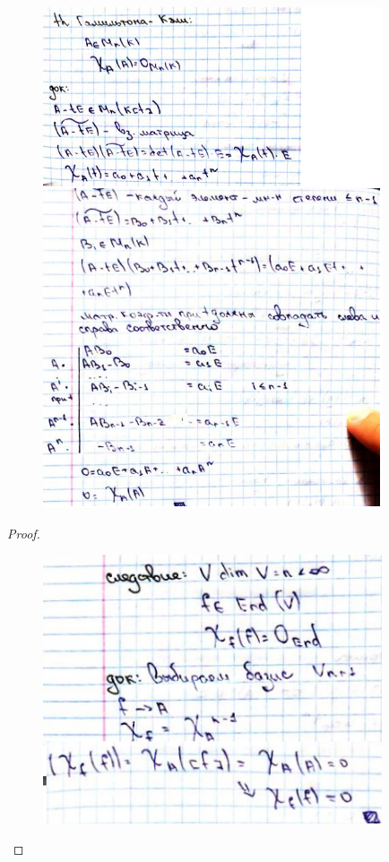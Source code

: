 \documentclass[algebra]{subfiles}
\begin{document}
        \begin{consequence}
          \begin{figure}[H]
                  \includegraphics[width=10cm]{pics/53_2}
                  \centering
          \end{figure}
        \end{consequence}

        \begin{proof}
          \begin{figure}[H]
                  \includegraphics[width=10cm]{pics/53_3}
                  \centering
          \end{figure}
        \end{proof}
\end{document}

